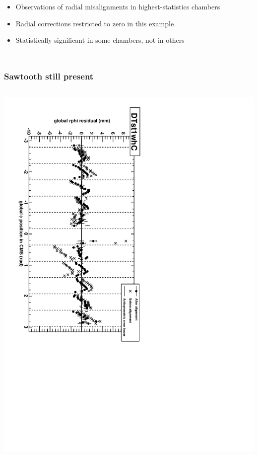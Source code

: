 \documentclass[compress]{beamer}
\begin{document}
\begin{frame}
\begin{columns}
\begin{itemize}\setlength{\itemsep}{0.25 cm}
\item Observations of radial misalignments in highest-statistics chambers
\item Radial corrections restricted to zero in this example
\item Statistically significant in some chambers, not in others
\end{itemize}
\end{columns}
\end{frame}

\begin{frame}
\frametitle{Sawtooth still present}

\begin{columns}

\includegraphics[height=\linewidth, angle=90]{sawtooth_still_present.pdf}


\end{columns}
\end{frame}
\end{document}
